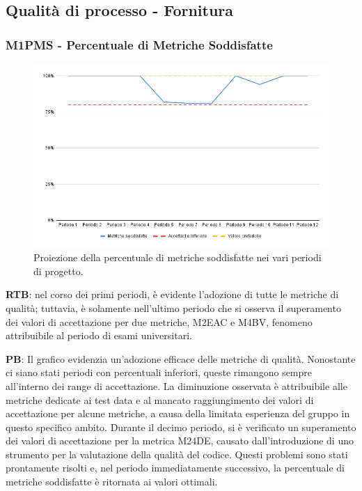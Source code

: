 \subsection{Qualità di processo - Fornitura}

\vspace{0.3cm}

\subsubsection{M1PMS - Percentuale di Metriche Soddisfatte}
\begin{figure}[H]
    \centering
    \includegraphics[width=1\textwidth]{../Images/PianoDiQualifica/M1PMS.png}
    \caption{Proiezione della percentuale di metriche soddisfatte nei vari periodi di progetto.}
    \label{fig:1}
\end{figure}

\vspace{0.2cm}

\textbf{RTB}: nel corso dei primi periodi, è evidente l'adozione di tutte le metriche di qualità; tuttavia, è solamente nell'ultimo periodo che si osserva il superamento dei valori di accettazione per due metriche, M2EAC e M4BV, fenomeno attribuibile al periodo di esami universitari.

\vspace{0.2cm}

\textbf{PB}: Il grafico evidenzia un’adozione efficace delle metriche di qualità. Nonostante ci siano stati periodi con percentuali inferiori, queste rimangono sempre all’interno dei range di accettazione. La diminuzione osservata è attribuibile alle metriche dedicate ai test data e al mancato raggiungimento dei valori di accettazione per alcune metriche, a causa della limitata esperienza del gruppo in questo specifico ambito. Durante il decimo periodo, si è verificato un superamento dei valori di accettazione per la metrica M24DE, causato dall’introduzione di uno strumento per la valutazione della qualità del codice. Questi problemi sono stati prontamente risolti e, nel periodo immediatamente successivo, la percentuale di metriche soddisfatte è ritornata ai valori ottimali.

